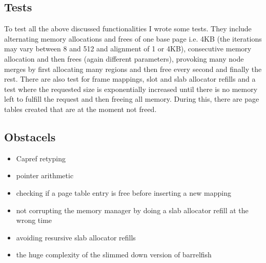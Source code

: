 \subsection{Tests}

To test all the above discussed functionalities I wrote some tests. They include alternating memory allocations and frees of one base page i.e. 4KB (the iterations may vary between 8 and 512 and alignment of 1 or 4KB), consecutive memory allocation and then frees (again different parameters), provoking many node merges by first allocating many regions and then free every second and finally the rest. There are also test for frame mappings, slot and slab allocator refills and a test where the requested size is exponentially increased until there is no memory left to fulfill the request and then freeing all memory.
During this, there are page tables created that are at the moment not freed.

\subsection{Obstacels}

\begin{itemize}
\item Capref retyping
\item pointer arithmetic
\item checking if a page table entry is free before inserting a new mapping
\item not corrupting the memory manager by doing a slab allocator refill at the wrong time
\item avoiding resursive slab allocator refills
\item the huge complexity of the slimmed down version of barrelfish
\end{itemize}